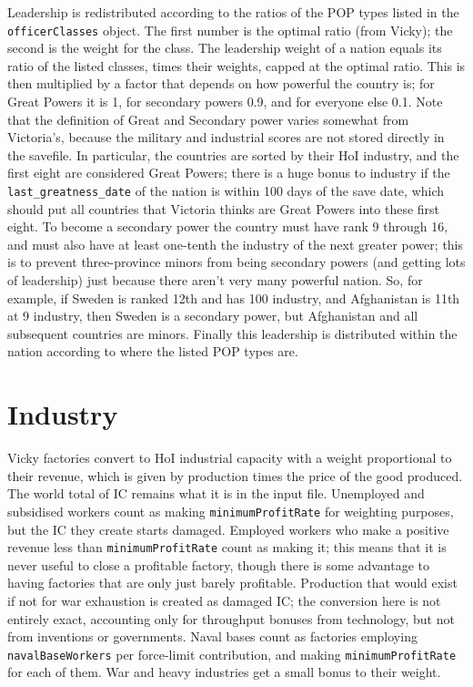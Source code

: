 \documentclass[12pt,ebook,oneside]{book}
\begin{document}
Leadership is redistributed according to the ratios of the POP types
listed in the \texttt{officerClasses} object. The first number is the
optimal ratio (from Vicky); the second is the weight for the
class. The leadership weight of a nation equals its ratio of the
listed classes, times their weights, capped at the optimal ratio. This
is then multiplied by a factor that depends on how powerful the
country is; for Great Powers it is 1, for secondary powers 0.9, and
for everyone else 0.1. Note that the definition of Great and Secondary
power varies somewhat from Victoria's, because the military and
industrial scores are not stored directly in the savefile. In
particular, the countries are sorted by their HoI industry, and the
first eight are considered Great Powers; there is a huge bonus to
industry if the \texttt{last\_greatness\_date} of the nation is within
100 days of the save date, which should put all countries that
Victoria thinks are Great Powers into these first eight. To
become a secondary power the country must have rank 9 through 16, and
must also have at least one-tenth the industry of the next greater
power; this is to prevent three-province minors from being secondary
powers (and getting lots of leadership) just because there aren't very
many powerful nation. So, for example, if Sweden is ranked 12th and
has 100 industry, and Afghanistan is 11th at 9 industry, then Sweden
is a secondary power, but Afghanistan and all subsequent countries are
minors. 
Finally this leadership is distributed
within the nation according to where the listed POP types are. 

\section{Industry} 

Vicky factories convert to HoI industrial capacity with a weight
proportional to their revenue, which is given by production times the
price of the good produced. The world total of IC remains what it
is in the input file. Unemployed and subsidised workers count as
making \texttt{minimumProfitRate} for weighting purposes, but the IC
they create starts damaged. Employed workers who make a positive
revenue less than \texttt{minimumProfitRate} count as making it; this
means that it is never useful to close a profitable factory, though
there is some advantage to having factories that are only just barely
profitable. Production that would exist if not for war exhaustion is
created as damaged IC; the conversion here is not entirely exact,
accounting only for throughput bonuses from technology, but not from
inventions or governments. Naval bases count as factories employing
\texttt{navalBaseWorkers} per force-limit contribution, and making
\texttt{minimumProfitRate} for each of them. War and heavy industries
get a small bonus to their weight. 
\end{document}
